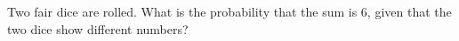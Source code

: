 Two fair dice are rolled. What is the probability that the sum is $6$, given that the two dice show different numbers?
